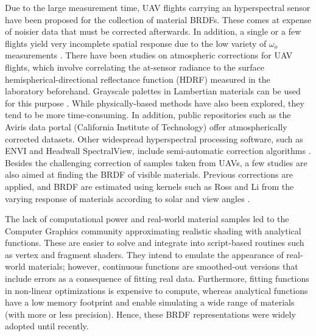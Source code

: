 Due to the large measurement time, UAV flights carrying an hyperspectral sensor have been proposed for the collection of material BRDFs. These comes at expense of noisier data that must be corrected afterwards. In addition, a single or a few flights yield very incomplete spatial response due to the low variety of $\omega_o$ measurements \cite{jurado_efficient_2022}. There have been studies on atmospheric corrections for UAV flights, which involve correlating the at-sensor radiance to the surface hemispherical-directional reflectance function (HDRF) measured in the laboratory beforehand. Grayscale palettes in Lambertian materials can be used for this purpose  \cite{lucieer_hyperuasimaging_2014}. While physically-based methods have also been explored, they tend to be more time-consuming. In addition, public repositories such as the Aviris data portal (California Institute of Technology) \cite{california_institute_of_technology_aviris_nodate} offer atmospherically corrected datasets. Other widespread hyperspectral processing software, such as ENVI and Headwall SpectralView, include semi-automatic correction algorithms \cite{queally_flexbrdf_2022, jia_kernel-driven_2020, sagan_data-driven_2022}. Besides the challenging correction of samples taken from UAVs, a few studies are also aimed at finding the BRDF of visible materials. Previous corrections are applied, and BRDF are estimated using kernels such as Ross and Li from the varying response of materials according to solar and view angles \cite{queally_flexbrdf_2022}.

The lack of computational power and real-world material samples led to the Computer Graphics community approximating realistic shading with analytical functions. These are easier to solve and integrate into script-based routines such as vertex and fragment shaders. They intend to emulate the appearance of real-world materials; however, continuous functions are smoothed-out versions that include errors as a consequence of fitting real data. Furthermore, fitting functions in non-linear optimizations is expensive to compute, whereas analytical functions have a low memory footprint and enable simulating a wide range of materials (with more or less precision). Hence, these BRDF representations were widely adopted until recently. 

